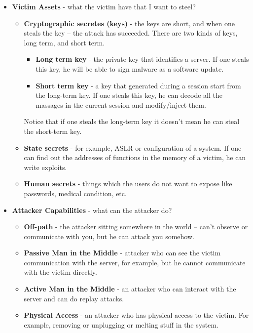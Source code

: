 \begin{itemize}
    \item \textbf{Victim Assets} - what the victim have that I want to steel? 
        \begin{itemize}
            \item \textbf{Cryptographic secretes (keys)} -  the keys are short, and when one steals the key – the attack has succeeded. There are two kinds of keys, long term, and short term.
                \begin{itemize}
                    \item \textbf{Long term key } - the private key that identifies a server. If one steals this key, he will be able to sign malware as a software update.
                    \item \textbf{Short term key} - a key that generated during a session start from the long-term key. If one steals this key, he can decode all the massages in the current session and modify/inject them.
                \end{itemize}
                Notice that if one steals the long-term key it doesn’t mean he can steal the short-term key.
            \item \textbf{State secrets} - for example, ASLR or configuration of a system. If one can find out the addresses of functions in the memory of a victim, he can write exploits. 
            \item \textbf{Human secrets} - things which the users do not want to expose like passwords, medical condition, etc.
        \end{itemize}
    \item \textbf{Attacker Capabilities} - what can the attacker do?
        \begin{itemize}
            \item \textbf{Off-path} - the attacker sitting somewhere in the world – can’t observe or communicate with you, but he can attack you somehow. 
            \item \textbf{Passive Man in the Middle} - attacker who can see the victim communication with the server, for example, but he cannot communicate with the victim directly.
            \item \textbf{Active Man in the Middle} - an attacker who can interact with the server and can do replay attacks.
            \item \textbf{Physical Access} - an attacker who has physical access to the victim. For example, removing or unplugging or melting stuff in the system.

\end{itemize}
\end{itemize}
